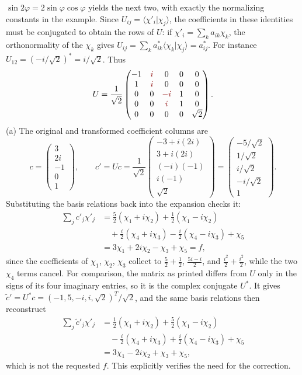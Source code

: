 $\sin2\varphi=2\sin\varphi\cos\varphi$ yields the next two, with exactly
the normalizing constants in the example. Since
$U_{ij}=\langle\chi'_i|\chi_j\rangle$, the coefficients in these
identities must be conjugated to obtain the rows of $U$: if
$\chi'_i=\sum_ka_{ik}\chi_k$, the orthonormality of the $\chi_k$ gives
$U_{ij}=\sum_ka_{ik}^*\langle\chi_k|\chi_j\rangle=a_{ij}^*$. For instance
$U_{12}=(-i/\sqrt2)^*=i/\sqrt2$. Thus
\[
U=\frac1{\sqrt2}\begin{pmatrix}
-1&\erratum{i}&0&0&0\\
1&\erratum{i}&0&0&0\\
0&0&\erratum{-i}&1&0\\
0&0&\erratum{i}&1&0\\
0&0&0&0&\sqrt2
\end{pmatrix}.
\]
(a) The original and transformed coefficient columns are
\[
c=\begin{pmatrix}3\\2i\\-1\\0\\1\end{pmatrix},\qquad
c'=Uc=\frac1{\sqrt2}
\begin{pmatrix}-3+i(2i)\\3+i(2i)\\(-i)(-1)\\i(-1)\\\sqrt2\end{pmatrix}
=\boxed{\begin{pmatrix}-5/\sqrt2\\1/\sqrt2\\i/\sqrt2\\-i/\sqrt2\\1\end{pmatrix}}.
\]
Substituting the basis relations back into the expansion checks it:
\begin{align*}
\sum_jc'_j\chi'_j
&=\frac52(\chi_1+i\chi_2)+\frac12(\chi_1-i\chi_2)\\
&\quad+\frac i2(\chi_4+i\chi_3)-\frac i2(\chi_4-i\chi_3)+\chi_5\\
&=3\chi_1+2i\chi_2-\chi_3+\chi_5=f,
\end{align*}
since the coefficients of $\chi_1$, $\chi_2$, $\chi_3$ collect to
$\frac52+\frac12$, $\frac{5i-i}2$, and $\frac{i^2}2+\frac{i^2}2$, while
the two $\chi_4$ terms cancel.
For comparison, the matrix as printed differs from $U$ only in the signs
of its four imaginary entries, so it is the complex conjugate $U^*$. It
gives $\widetilde c'=U^*c=(-1,5,-i,i,\sqrt2)^T/\sqrt2$, and the same
basis relations then reconstruct
\begin{align*}
\sum_j\widetilde c'_j\chi'_j
&=\frac12(\chi_1+i\chi_2)+\frac52(\chi_1-i\chi_2)\\
&\quad-\frac i2(\chi_4+i\chi_3)+\frac i2(\chi_4-i\chi_3)+\chi_5\\
&=3\chi_1-2i\chi_2+\chi_3+\chi_5,
\end{align*}
which is not the requested $f$.
This explicitly verifies the need for the correction.

